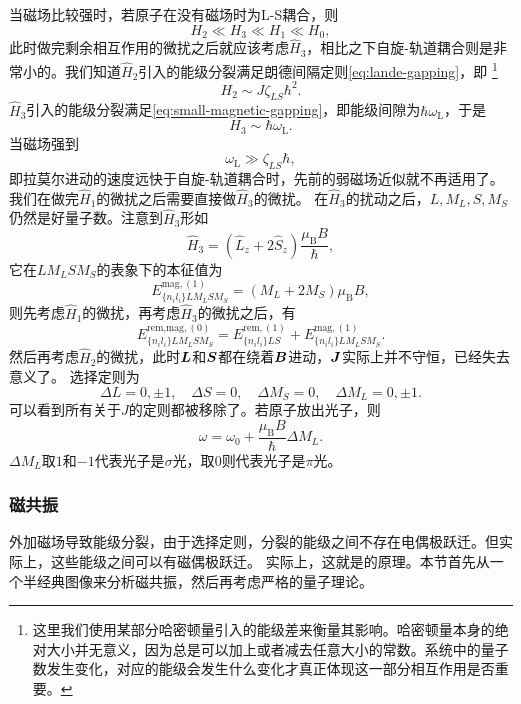 当磁场比较强时，若原子在没有磁场时为L-S耦合，则
\begin{equation}
    {H}_2 \ll {H}_3 \ll {H}_1 \ll {H}_0,
\end{equation}
此时做完剩余相互作用的微扰之后就应该考虑$\hat{H}_3$，相比之下自旋-轨道耦合则是非常小的。我们知道$\hat{H}_2$引入的能级分裂满足朗德间隔定则\eqref{eq:lande-gapping}，即%
\footnote{这里我们使用某部分哈密顿量引入的能级差来衡量其影响。哈密顿量本身的绝对大小并无意义，因为总是可以加上或者减去任意大小的常数。系统中的量子数发生变化，对应的能级会发生什么变化才真正体现这一部分相互作用是否重要。}%
\[
    H_2 \sim J \zeta_{LS} \hbar^2.
\]
$\hat{H}_3$引入的能级分裂满足\eqref{eq:small-magnetic-gapping}，即能级间隙为$\hbar \omega_\text{L}$，于是
\[
    H_3 \sim \hbar \omega_\text{L}.
\]
当磁场强到
\begin{equation}
    \omega_\text{L} \gg \zeta_{LS} \hbar,
\end{equation}
即拉莫尔进动的速度远快于自旋-轨道耦合时，先前的弱磁场近似就不再适用了。
我们在做完$\hat{H}_1$的微扰之后需要直接做$\hat{H}_3$的微扰。
在$\hat{H}_3$的扰动之后，$L, M_L, S, M_S$仍然是好量子数。注意到$\hat{H}_3$形如
\[
    \hat{H}_3 = (\hat{L}_z + 2 \hat{S}_z) \frac{\mu_\text{B} B}{\hbar}, 
\]
它在$L M_L S M_S$的表象下的本征值为
\begin{equation}
    E^{\text{mag}, (1)}_{\{n_i l_i\} L M_L S M_S} = (M_L + 2 M_S) \mu_\text{B} B,
\end{equation}
则先考虑$\hat{H}_1$的微扰，再考虑$\hat{H}_3$的微扰之后，有
\[
    E^{\text{rem,mag}, (0)}_{\{n_i l_i\} L M_L S M_S} = E^{\text{rem}, (1)}_{\{n_i l_i\} LS} + E^{\text{mag}, (1)}_{\{n_i l_i\} L M_L S M_S}.
\]
然后再考虑$\hat{H}_2$的微扰，此时$\vb*{L}$和$\vb*{S}$都在绕着$\vb*{B}$进动，$\vb*{J}$实际上并不守恒，已经失去意义了。
选择定则为
\begin{equation}
    \Delta L = 0, \pm 1, \quad \Delta S = 0, \quad \Delta M_S = 0, \quad \Delta M_L = 0, \pm 1.
\end{equation}
可以看到所有关于$J$的定则都被移除了。若原子放出光子，则
\begin{equation}
    \omega = \omega_0 + \frac{\mu_\text{B} B}{\hbar} \Delta M_L.
\end{equation}
$\Delta M_L$取$1$和$-1$代表光子是$\sigma$光，取$0$则代表光子是$\pi$光。

\subsubsection{磁共振}

外加磁场导致能级分裂，由于选择定则，分裂的能级之间不存在电偶极跃迁。但实际上，这些能级之间可以有磁偶极跃迁。
实际上，这就是的原理。本节首先从一个半经典图像来分析磁共振，然后再考虑严格的量子理论。

